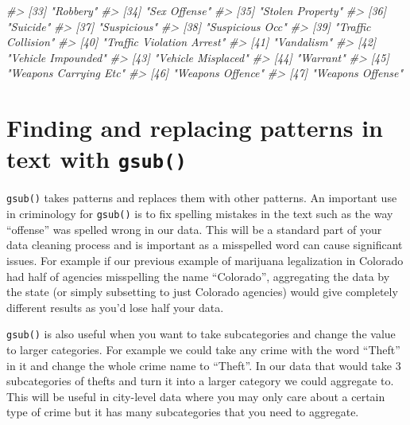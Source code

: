 \documentclass[
  12pt,
]{book}
\newenvironment{Shaded}{\begin{snugshade}}{\end{snugshade}}
\newcommand{\CommentTok}[1]{\textcolor[rgb]{0.56,0.35,0.01}{\textit{#1}}}
\begin{document}
\begin{Shaded}
\begin{Highlighting}[]
\CommentTok{\#> [33] "Robbery"                                   }
\CommentTok{\#> [34] "Sex Offense"                               }
\CommentTok{\#> [35] "Stolen Property"                           }
\CommentTok{\#> [36] "Suicide"                                   }
\CommentTok{\#> [37] "Suspicious"                                }
\CommentTok{\#> [38] "Suspicious Occ"                            }
\CommentTok{\#> [39] "Traffic Collision"                         }
\CommentTok{\#> [40] "Traffic Violation Arrest"                  }
\CommentTok{\#> [41] "Vandalism"                                 }
\CommentTok{\#> [42] "Vehicle Impounded"                         }
\CommentTok{\#> [43] "Vehicle Misplaced"                         }
\CommentTok{\#> [44] "Warrant"                                   }
\CommentTok{\#> [45] "Weapons Carrying Etc"                      }
\CommentTok{\#> [46] "Weapons Offence"                           }
\CommentTok{\#> [47] "Weapons Offense"}
\end{Highlighting}
\end{Shaded}

\hypertarget{finding-and-replacing-patterns-in-text-with-gsub}{%
\section{\texorpdfstring{Finding and replacing patterns in text with \texttt{gsub()}}{Finding and replacing patterns in text with gsub()}}\label{finding-and-replacing-patterns-in-text-with-gsub}}

\texttt{gsub()} takes patterns and replaces them with other patterns. An important use in criminology for \texttt{gsub()} is to fix spelling mistakes in the text such as the way ``offense'' was spelled wrong in our data. This will be a standard part of your data cleaning process and is important as a misspelled word can cause significant issues. For example if our previous example of marijuana legalization in Colorado had half of agencies misspelling the name ``Colorado'', aggregating the data by the state (or simply subsetting to just Colorado agencies) would give completely different results as you'd lose half your data.

\texttt{gsub()} is also useful when you want to take subcategories and change the value to larger categories. For example we could take any crime with the word ``Theft'' in it and change the whole crime name to ``Theft''. In our data that would take 3 subcategories of thefts and turn it into a larger category we could aggregate to. This will be useful in city-level data where you may only care about a certain type of crime but it has many subcategories that you need to aggregate.
\end{document}
